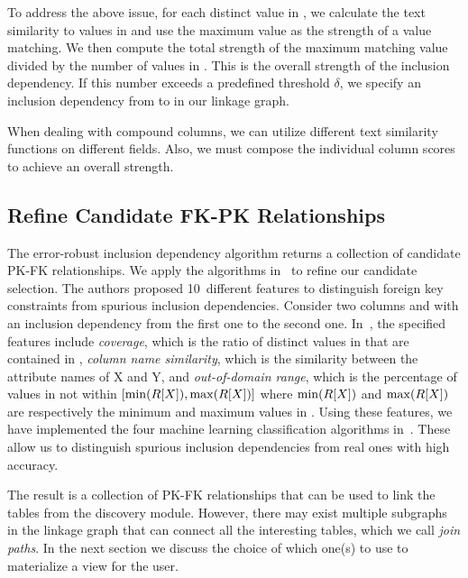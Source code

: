 To address the above issue, for each distinct value in \RX, we calculate the text similarity to values in \SY and use the maximum value as the strength of a value matching. We then compute the total strength of the maximum matching value divided by the number of values in \RX. This is the overall strength of the inclusion dependency.  
If this number exceeds a predefined threshold $\delta$, we specify an inclusion dependency from \RX to \SY in our linkage graph.

When dealing with compound columns, we can utilize different text similarity functions on different fields. 
Also, we must compose the individual column scores to achieve an overall strength.


\subsection{Refine Candidate FK-PK Relationships}\label{subsec:refine}


The error-robust inclusion dependency algorithm returns a collection of candidate PK-FK relationships.
We apply the algorithms in~\cite{DBLP:conf/webdb/RostinABNL09} to refine our candidate selection. The authors proposed 10~different features to distinguish foreign key constraints from spurious inclusion dependencies. Consider two columns \RX and \SY with an inclusion dependency from the first one to the second one. In~\cite{DBLP:conf/webdb/RostinABNL09}, the specified features include 
\emph{coverage}, which is the ratio of distinct values in \RX that are contained in \SY, 
\emph{column name similarity}, which is the similarity between the attribute names of X and Y, 
and \emph{out-of-domain range}, which is the percentage of values in \SY not within $[\min(R[X]), \max(R[X])]$ where $\min(R[X])$ and $\max(R[X])$ are respectively the minimum and maximum values in \RX.
Using these features, we have implemented the four machine learning classification algorithms in~\cite{DBLP:conf/webdb/RostinABNL09}. These allow us to distinguish spurious inclusion dependencies from real ones  with high accuracy.

The result is a collection of PK-FK relationships that can be used to link the tables from the discovery module. However, there may exist multiple subgraphs in the linkage graph that can connect all the interesting tables, which we call \emph{join paths}. In the next section we discuss the choice of which one(s) to use to materialize a view for the user.


